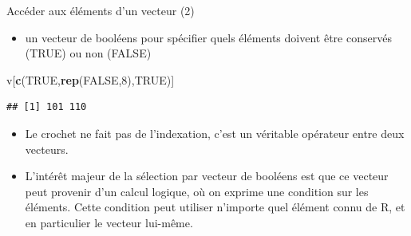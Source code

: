\documentclass[
  ignorenonframetext,
]{beamer}
\newenvironment{Shaded}{\begin{snugshade}}{\end{snugshade}}
\newcommand{\ConstantTok}[1]{\textcolor[rgb]{0.56,0.35,0.01}{#1}}
\newcommand{\DecValTok}[1]{\textcolor[rgb]{0.00,0.00,0.81}{#1}}
\newcommand{\FunctionTok}[1]{\textcolor[rgb]{0.13,0.29,0.53}{\textbf{#1}}}
\newcommand{\NormalTok}[1]{#1}
\providecommand{\tightlist}{%
  \setlength{\itemsep}{0pt}\setlength{\parskip}{0pt}}
\begin{document}
\begin{frame}[fragile]{Accéder aux éléments d'un vecteur (2)}
\protect\hypertarget{accuxe9der-aux-uxe9luxe9ments-dun-vecteur-2}{}
\begin{itemize}
\tightlist
\item
  un vecteur de booléens pour spécifier quels éléments doivent être
  conservés (TRUE) ou non (FALSE)
\end{itemize}

\tiny

\begin{Shaded}
\begin{Highlighting}[]
\NormalTok{v[}\FunctionTok{c}\NormalTok{(}\ConstantTok{TRUE}\NormalTok{,}\FunctionTok{rep}\NormalTok{(}\ConstantTok{FALSE}\NormalTok{,}\DecValTok{8}\NormalTok{),}\ConstantTok{TRUE}\NormalTok{)]}
\end{Highlighting}
\end{Shaded}

\begin{verbatim}
## [1] 101 110
\end{verbatim}

\normalsize

\begin{itemize}
\tightlist
\item
  Le crochet ne fait pas de l'indexation, c'est un véritable opérateur
  entre deux vecteurs.
\item
  L'intérêt majeur de la sélection par vecteur de booléens est que ce
  vecteur peut provenir d'un calcul logique, où on exprime une condition
  sur les éléments. Cette condition peut utiliser n'importe quel élément
  connu de R, et en particulier le vecteur lui-même.
\end{itemize}
\end{frame}
\end{document}
